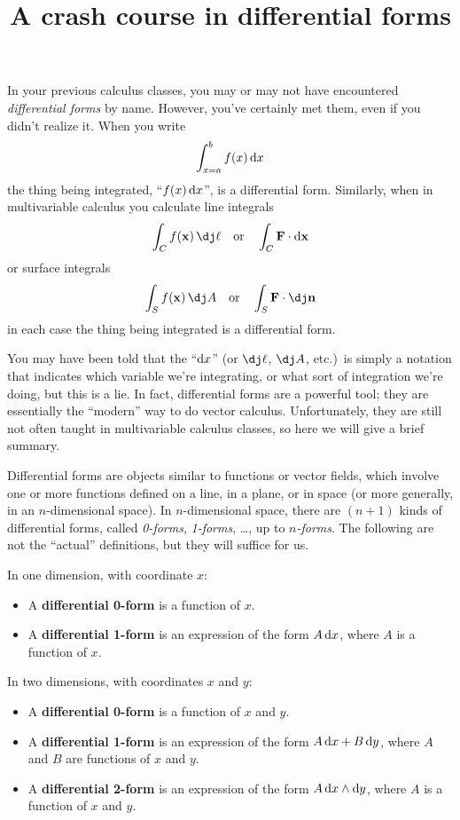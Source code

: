 \documentclass[12pt]{amsart}
\title{A crash course in differential forms}
\begin{document}
\maketitle

In your previous calculus classes, you may or may not have encountered \emph{differential forms} by name.
However, you've certainly met them, even if you didn't realize it.
When you write
\[ \int_{x=a}^b f(x) \,{\mathrm{d} x} \]
the thing being integrated, ``$f(x) \,{\mathrm{d} x}$'', is a differential form.
Similarly, when in multivariable calculus you calculate line integrals
\[ \int_{\curve} f(\ptx) \, \dl \quad\text{or}\quad \int_{\curve} \dotp{\vc{F}}{\dpx} \]
or surface integrals
\[ \int_{\surf} f(\ptx) \,\dA \quad\text{or}\quad \int_{\surf} \dotp{\vc{F}}{\dn} \]
in each case the thing being integrated is a differential form.

You may have been told that the ``${\mathrm{d} x}$'' (or $\dl$, $\dA$, etc.)\ is simply a notation that indicates which variable we're integrating, or what sort of integration we're doing, but this is a lie.
In fact, differential forms are a powerful tool; they are essentially the ``modern'' way to do vector calculus.
Unfortunately, they are still not often taught in multivariable calculus classes, so here we will give a brief summary.

Differential forms are objects similar to functions or vector fields, which involve one or more functions defined on a line, in a plane, or in space (or more generally, in an $n$-dimensional space).
In $n$-dimensional space, there are $(n+1)$ kinds of differential forms, called \emph{0-forms}, \emph{1-forms}, \dots, up to \emph{$n$-forms}.
The following are not the ``actual'' definitions, but they will suffice for us.

\begin{defn}
  In one dimension, with coordinate $x$:
  \begin{itemize}
  \item A \textbf{differential 0-form} is a function of $x$.
  \item A \textbf{differential 1-form} is an expression of the form $A\,{\mathrm{d} x}$, where $A$ is a function of $x$.
  \end{itemize}
\end{defn}

\begin{defn}
  In two dimensions, with coordinates $x$ and $y$:
  \begin{itemize}
  \item A \textbf{differential 0-form} is a function of $x$ and $y$.
  \item A \textbf{differential 1-form} is an expression of the form $A\,{\mathrm{d} x}+B\,{\mathrm{d} y}$, where $A$ and $B$ are functions of $x$ and $y$.
  \item A \textbf{differential 2-form} is an expression of the form $A\,{\mathrm{d} x}\wedge{\ensuremath{\mathrm{d} y}}$, where $A$ is a function of $x$ and $y$.
  \end{itemize}
\end{defn}
\end{document}
